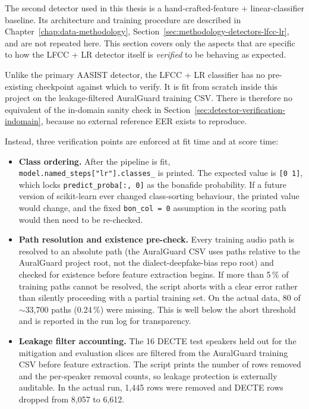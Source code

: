 The second detector used in this thesis is a hand-crafted-feature
+ linear-classifier baseline. Its architecture and training
procedure are described in Chapter~\ref{chap:data-methodology},
Section~\ref{sec:methodology-detectors-lfcc-lr}, and are not
repeated here. This section covers only the aspects that are
specific to how the LFCC + LR detector itself is \emph{verified} to
be behaving as expected.

Unlike the primary AASIST detector, the LFCC + LR classifier has
no pre-existing checkpoint against which to verify. It is fit from
scratch inside this project on the leakage-filtered AuralGuard
training CSV. There is therefore no equivalent of the in-domain
sanity check in Section~\ref{sec:detector-verification-indomain},
because no external reference EER exists to reproduce.

Instead, three verification points are enforced at fit time and
at score time:

\begin{itemize}
    \item \textbf{Class ordering.} After the pipeline is fit,
        \texttt{model.named\_steps}\allowbreak\texttt{["lr"].classes\_} is printed. The expected
        value is \texttt{[0 1]}, which locks \texttt{predict\_proba[:, 0]} as the
        bonafide probability. If a future version of scikit-learn ever
        changed class-sorting behaviour, the printed value would change,
        and the fixed \texttt{bon\_col = 0} assumption in the scoring path
        would then need to be re-checked.
    \item \textbf{Path resolution and existence pre-check.} Every training
        audio path is resolved to an absolute path (the AuralGuard CSV
        uses paths relative to the AuralGuard project root, not the
        dialect-deepfake-bias repo root) and checked for existence
        before feature extraction begins. If more than 5\,\% of training
        paths cannot be resolved, the script aborts with a clear error
        rather than silently proceeding with a partial training set.
        On the actual data, 80 of $\sim$33,700 paths (0.24\,\%) were missing.
        This is well below the abort threshold and is reported in the
        run log for transparency.
    \item \textbf{Leakage filter accounting.} The 16 DECTE test speakers held
        out for the mitigation and evaluation slices are filtered from
        the AuralGuard training CSV before feature extraction. The
        script prints the number of rows removed and the per-speaker
        removal counts, so leakage protection is externally auditable.
        In the actual run, 1,445 rows were removed and DECTE rows
        dropped from 8,057 to 6,612.
\end{itemize}

